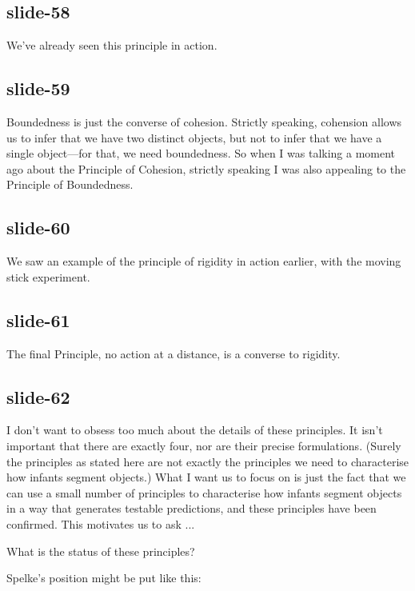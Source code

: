 \documentclass[12pt,\papersize]{extarticle}
\begin{document}
\subsection{slide-58}
We've already seen this principle in action.
 
\subsection{slide-59}
Boundedness is just the converse of cohesion.
Strictly speaking, cohension allows us to infer that we have two 
distinct objects, but not to infer that we have a single object---for that, we need boundedness.
So when I was talking a moment ago about the Principle of Cohesion, strictly speaking I was 
also appealing to the Principle of Boundedness.
 
\subsection{slide-60}
We saw an example of the principle of rigidity in action earlier, with the moving stick 
experiment.
 
\subsection{slide-61}
The final Principle, no action at a distance, is a converse to rigidity.
 
\subsection{slide-62}
I don't want to obsess too much about the details of these principles.  
It isn't important that there are exactly four, nor are their precise formulations.
(Surely the principles as stated here are not exactly the principles we need to characterise
how infants segment objects.)
What I want us to focus on is just the fact that we can use a small number of principles to 
characterise how infants segment objects in a way that generates testable predictions,
and these principles have been confirmed.
This motivates us to ask ...
 
What is the status of these principles?
 
Spelke’s position might be put like this:
 
\end{document}
